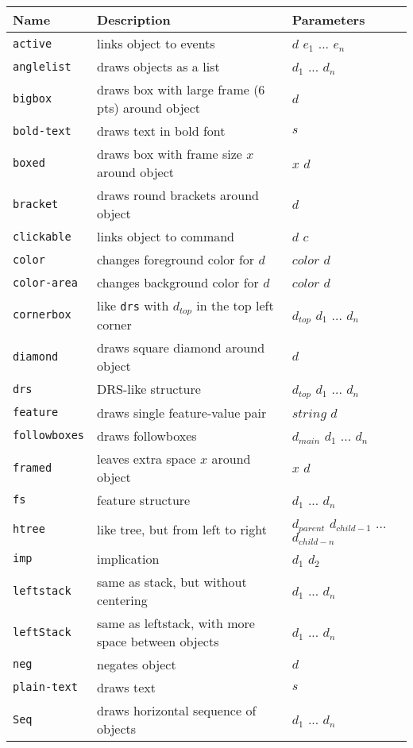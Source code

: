 \begin{center}
\begin{tabular}{l|l|l}
   Name & Description & Parameters \\ \hline
   {\tt active} & links object to events & $d$ $e_1$ ... $e_n$ \\
   {\tt anglelist} & draws objects as a list & $d_1$ ... $d_n$ \\ 
   {\tt bigbox} & draws box with large frame (6 pts) around object & $d$ \\
   {\tt bold-text} & draws text in bold font & $s$ \\
   {\tt boxed} & draws box with frame size $x$ around object & $x$ $d$ \\
   {\tt bracket} & draws round brackets around object & $d$ \\
   {\tt clickable} & links object to command & $d$ $c$ \\
   {\tt color} & changes foreground color for $d$ & $color$ $d$ \\
   {\tt color-area} & changes background color for $d$ & $color$ $d$ \\ 
   {\tt cornerbox} & like {\tt drs} with $d_{top}$ in the top left corner &
     $d_{top}$ $d_1$ ... $d_n$ \\
   {\tt diamond} & draws square diamond around object & $d$ \\
   {\tt drs} & DRS-like structure & $d_{top}$ $d_1$ ... $d_n$ \\  
   {\tt feature} & draws single feature-value pair & $string$ $d$ \\
   {\tt followboxes} & draws followboxes & $d_{main}$ $d_1$ ... $d_n$ \\
   {\tt framed} & leaves extra space $x$ around object & $x$ $d$ \\
   {\tt fs} & feature structure & $d_1$ ... $d_n$ \\
   {\tt htree} & like tree, but from left to right & $d_{parent}$
     $d_{child-1}$ ... $d_{child-n}$ \\
   {\tt imp} & implication & $d_1$ $d_2$ \\
   {\tt leftstack} & same as stack, but without centering & $d_1$ ...
     $d_n$ \\
   {\tt leftStack} & same as leftstack, with more space between objects
     & $d_1$ ... $d_n$ \\
   {\tt neg} & negates object & $d$ \\
   {\tt plain-text} & draws text & $s$ \\
   {\tt Seq} & draws horizontal sequence of objects & $d_1$ ... $d_n$ \\

\end{tabular}
\end{center}
